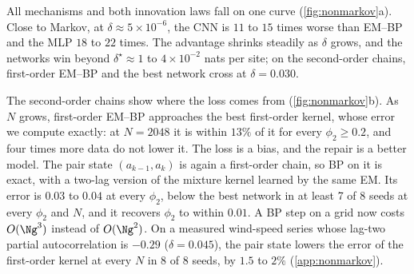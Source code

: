 All mechanisms and both innovation laws fall on one curve (\cref{fig:nonmarkov}a). Close to Markov, at
$\delta\approx5\times10^{-6}$, the CNN is $11$ to $15$ times worse than EM--BP and the MLP $18$ to $22$ times. The
advantage shrinks steadily as $\delta$ grows, and the networks win beyond $\delta^\star\approx1$ to $4\times10^{-2}$
nats per site; on the second-order chains, first-order EM--BP and the best network cross at $\delta=0.030$.

The second-order chains show where the loss comes from (\cref{fig:nonmarkov}b). As $N$ grows, first-order EM--BP
approaches the best first-order kernel, whose error we compute exactly: at $N=2048$ it is within $13\%$ of it for every
$\phi_2\geq0.2$, and four times more data do not lower it. The loss is a bias, and the repair is a better model. The
pair state $(a_{k-1},a_k)$ is again a first-order chain, so BP on it is exact, with a two-lag version of the mixture
kernel learned by the same EM. Its error is $0.03$ to $0.04$ at every $\phi_2$, below the best network in at least 7 of
8 seeds at every $\phi_2$ and $N$, and it recovers $\phi_2$ to within $0.01$. A BP step on a grid now costs
$O(\Ng^3)$ instead of $O(\Ng^2)$. On a measured wind-speed series whose lag-two partial autocorrelation is $-0.29$
($\delta=0.045$), the pair state lowers the error of the first-order kernel at every $N$ in 8 of 8 seeds, by $1.5$ to
$2\%$ (\cref{app:nonmarkov}).
